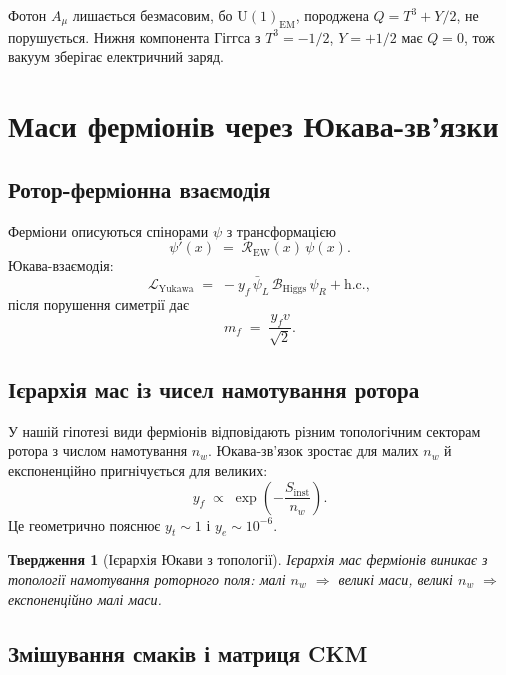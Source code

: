 \documentclass[11pt,a4paper]{article}
\newcommand{\Rotor}{\mathcal{R}}
\newcommand{\Biv}{\mathcal{B}}
\newcommand{\UU}{\mathrm{U}}
\newcommand{\Lag}{\mathcal{L}}
\theoremstyle{definition}
\theoremstyle{plain}
\newtheorem{proposition}{Твердження}
\theoremstyle{remark}
\begin{document}
Фотон $A_\mu$ лишається безмасовим, бо $\UU(1)_{\text{EM}}$, породжена $Q=T^3+Y/2$, не порушується. Нижня компонента Гіггса з $T^3=-1/2$, $Y=+1/2$ має $Q=0$, тож вакуум зберігає електричний заряд.

\vspace{1em}

\section{Маси ферміонів через Юкава-зв’язки}\label{sec:fermion-masses}

\subsection{Ротор-ферміонна взаємодія}

Ферміони описуються спінорами $\psi$ з трансформацією
\begin{equation}
  \psi'(x) \;=\; \Rotor_{\text{EW}}(x)\,\psi(x).
\end{equation}
Юкава-взаємодія:
\begin{equation}
  \Lag_{\text{Yukawa}} \;=\; -y_f\, \bar{\psi}_L\, \Biv_{\text{Higgs}}\, \psi_R + \text{h.c.},
\end{equation}
після порушення симетрії дає
\begin{equation}
  \boxed{m_f \;=\; \frac{y_f v}{\sqrt{2}}.}
\end{equation}

\subsection{Ієрархія мас із чисел намотування ротора}

У нашій гіпотезі види ферміонів відповідають різним топологічним секторам ротора з числом намотування $n_w$. Юкава-зв’язок зростає для малих $n_w$ й експоненційно пригнічується для великих:
\begin{equation}
  y_f \;\propto\; \exp\!\left(-\frac{S_{\text{inst}}}{n_w}\right).
\end{equation}
Це геометрично пояснює $y_t\sim 1$ і $y_e\sim 10^{-6}$.

\begin{proposition}[Ієрархія Юкави з топології]
Ієрархія мас ферміонів виникає з топології намотування роторного поля: малі $n_w$ $\Rightarrow$ великі маси, великі $n_w$ $\Rightarrow$ експоненційно малі маси.
\end{proposition}

\subsection{Змішування смаків і матриця CKM}
\end{document}
